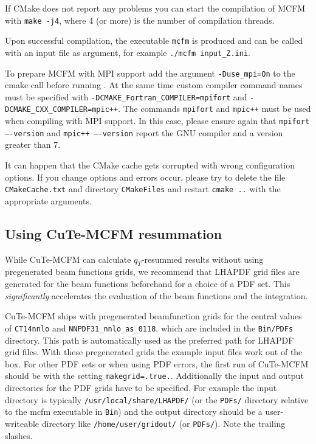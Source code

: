 \documentclass[
  11pt]{scrartcl}
\begin{document}
If CMake does not report any problems you can start the compilation of
MCFM with \texttt{make -j4}, where 4 (or more) is the number of
compilation threads.

Upon successful compilation, the executable \texttt{mcfm} is produced and
can be called with an input file as argument, for example \texttt{./mcfm input\_Z.ini}.

To prepare MCFM with MPI
support add the argument \texttt{-Duse\_mpi=On} to the cmake call before
running . At the same time custom compiler command names must
be specified with \texttt{-DCMAKE\_Fortran\_COMPILER=mpifort} and
\texttt{-DCMAKE\_CXX\_COMPILER=mpic++}. The commands \texttt{mpifort}
and \texttt{mpic++} must be used when compiling with MPI support. In
this case, please ensure again that \texttt{mpifort ----version} and
\texttt{mpic++ ----version} report the GNU compiler and a version
greater than 7.

It can happen that the CMake cache gets corrupted with wrong
configuration options. If you change options and errors occur, please
try to delete the file \texttt{CMakeCache.txt} and directory
\texttt{CMakeFiles} and restart \texttt{cmake ..} with the appropriate arguments.

\hypertarget{using-cute-mcfm-resummation}{%
\subsection{Using CuTe-MCFM
resummation}\label{using-cute-mcfm-resummation}}

While CuTe-MCFM can calculate \(q_T\)-resummed results without using
pregenerated beam functions grids, we recommend that LHAPDF grid files are
generated for the beam functions beforehand for a choice of a PDF set. This
\emph{significantly} accelerates the evaluation of the beam functions and the
integration.

CuTe-MCFM ships with pregenerated beamfunction grids for the central
values of \texttt{CT14nnlo} and \texttt{NNPDF31\_nnlo\_as\_0118}, which
are included in the \texttt{Bin/PDFs} directory. This path is automatically used
as the preferred path for LHAPDF grid files. With these pregenerated
grids the example input files work out of the box. For other PDF sets or
when using PDF errors, the first run of CuTe-MCFM should be with the
setting \texttt{makegrid=.true.}. Additionally the input and output
directories for the PDF grids have to be specified. For example the
input directory is typically \texttt{/usr/local/share/LHAPDF/} (or the
\texttt{PDFs/} directory relative to the mcfm executable in \texttt{Bin}) and
the output directory should be a user-writeable directory like
\texttt{/home/user/gridout/} (or \texttt{PDFs/}). Note the trailing slashes.
\end{document}
